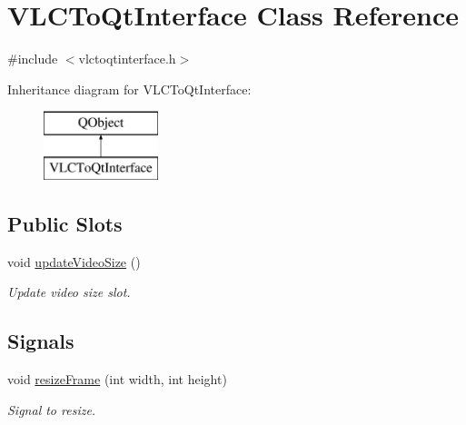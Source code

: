 \hypertarget{classVLCToQtInterface}{\section{V\-L\-C\-To\-Qt\-Interface Class Reference}
\label{classVLCToQtInterface}
}


{\ttfamily \#include $<$vlctoqtinterface.\-h$>$}

Inheritance diagram for V\-L\-C\-To\-Qt\-Interface\-:\begin{figure}[H]
\begin{center}
\leavevmode
\includegraphics[height=2.000000cm]{classVLCToQtInterface}
\end{center}
\end{figure}
\subsection*{Public Slots}
\begin{DoxyCompactItemize}
\item 
void \hyperlink{classVLCToQtInterface_a93079dc8c7e065a6b9ff2a956e663259}{update\-Video\-Size} ()
\begin{DoxyCompactList}\small\item\em Update video size slot. \end{DoxyCompactList}\end{DoxyCompactItemize}
\subsection*{Signals}
\begin{DoxyCompactItemize}
\item 
void \hyperlink{classVLCToQtInterface_aaf0ae5e8675efd6c039df97c4c24bd77}{resize\-Frame} (int width, int height)
\begin{DoxyCompactList}\small\item\em Signal to resize. \end{DoxyCompactList}\end{DoxyCompactItemize}
